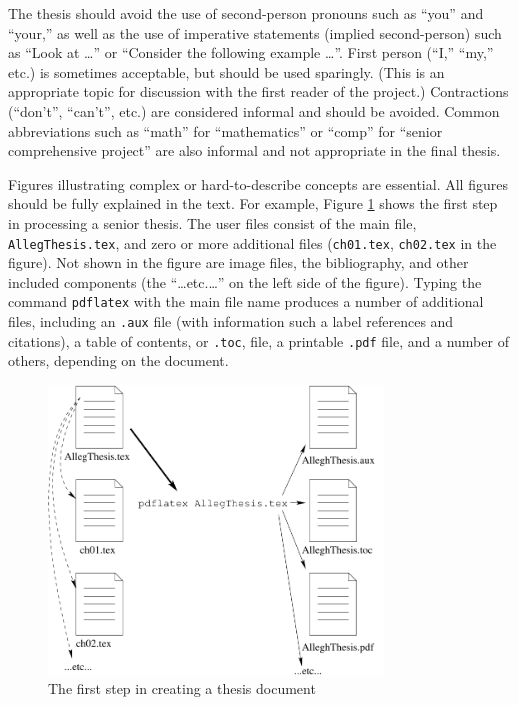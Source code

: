 The thesis should avoid the use of second-person pronouns such as ``you''
and ``your,'' as well as the use of imperative statements (implied
second-person) such as ``Look
at \ldots'' or ``Consider the following example \ldots''. 
First person (``I,'' ``my,'' etc.) is sometimes acceptable, 
but should be used sparingly. (This is an appropriate topic 
for discussion with the first reader of the project.) Contractions (``don't'',
``can't'', etc.) are considered informal and should be avoided. Common
abbreviations such as ``math'' for ``mathematics'' or ``comp'' for 
``senior comprehensive project''  are also informal and not appropriate
in the final thesis.

Figures illustrating complex or hard-to-describe concepts are essential.
All figures should be fully explained in the text. For example,
Figure \ref{latexprocess} shows the first step in processing a senior thesis.
The user files consist of the main file, {\tt AllegThesis.tex}, and zero or
more additional files ({\tt ch01.tex}, {\tt ch02.tex} in the figure). Not shown
in the figure are image files, the bibliography, and other included
components (the ``\ldots etc.\ldots'' on the left side of the figure). 
Typing the command {\tt pdflatex} with the main file name
produces a number of additional files, including an {\tt .aux} file (with
information such a label references and citations),
a table of contents, or {\tt .toc}, file, a printable {\tt .pdf} file, and
a number of others, depending on the document.


\begin{figure}[htbp]
\centering
\includegraphics[width=3.5in]{latexprocess-eps-converted-to.pdf}
\caption{The first step in creating a thesis document}
\label{latexprocess}
\end{figure}

